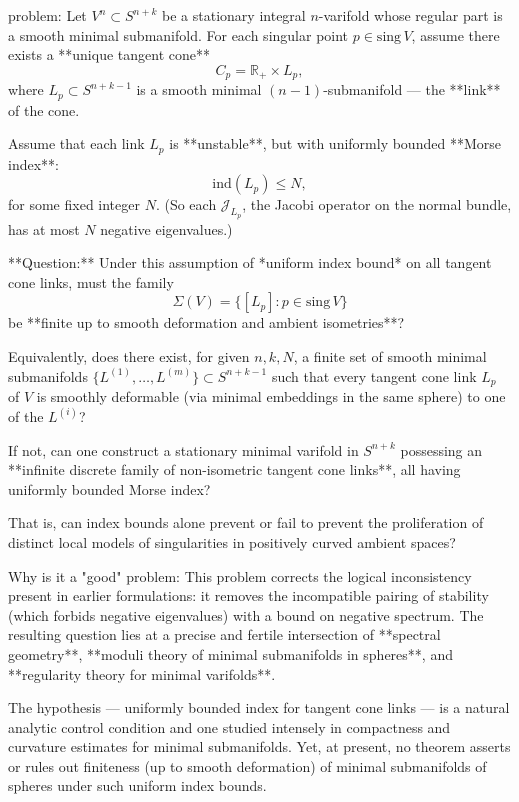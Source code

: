 problem:  
Let \(V^n \subset S^{n+k}\) be a stationary integral \(n\)-varifold whose regular part is a smooth minimal submanifold.  
For each singular point \(p \in \mathrm{sing}\,V\), assume there exists a **unique tangent cone**
\[
C_p = \mathbb{R}_+ \times L_p,
\]
where \(L_p \subset S^{n+k-1}\) is a smooth minimal \((n-1)\)-submanifold — the **link** of the cone.

Assume that each link \(L_p\) is **unstable**, but with uniformly bounded **Morse index**:
\[
\mathrm{ind}(L_p) \le N,
\]
for some fixed integer \(N\).  (So each \(\mathcal{J}_{L_p}\), the Jacobi operator on the normal bundle, has at most \(N\) negative eigenvalues.)

**Question:**  
Under this assumption of *uniform index bound* on all tangent cone links, must the family
\[
\Sigma(V) = \{[L_p] : p \in \mathrm{sing}\,V\}
\]
be **finite up to smooth deformation and ambient isometries**?  

Equivalently, does there exist, for given \(n,k,N\), a finite set of smooth minimal submanifolds  
\(\{L^{(1)}, \ldots, L^{(m)}\} \subset S^{n+k-1}\)  
such that every tangent cone link \(L_p\) of \(V\) is smoothly deformable (via minimal embeddings in the same sphere) to one of the \(L^{(i)}\)?  

If not, can one construct a stationary minimal varifold in \(S^{n+k}\) possessing an **infinite discrete family of non-isometric tangent cone links**, all having uniformly bounded Morse index?  

That is, can index bounds alone prevent or fail to prevent the proliferation of distinct local models of singularities in positively curved ambient spaces?

Why is it a "good" problem:  
This problem corrects the logical inconsistency present in earlier formulations: it removes the incompatible pairing of stability (which forbids negative eigenvalues) with a bound on negative spectrum. The resulting question lies at a precise and fertile intersection of **spectral geometry**, **moduli theory of minimal submanifolds in spheres**, and **regularity theory for minimal varifolds**.  

The hypothesis — uniformly bounded index for tangent cone links — is a natural analytic control condition and one studied intensely in compactness and curvature estimates for minimal submanifolds. Yet, at present, no theorem asserts or rules out finiteness (up to smooth deformation) of minimal submanifolds of spheres under such uniform index bounds.  

